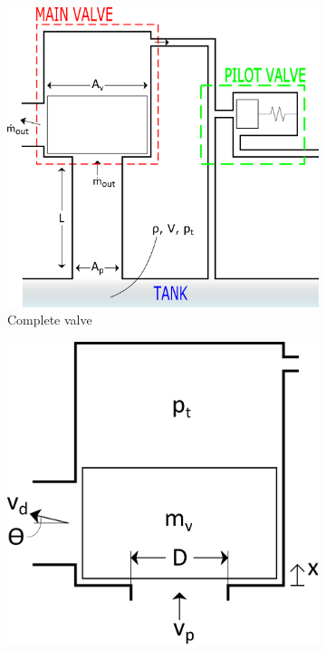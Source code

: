 \begin{figure}[ht]
    \begin{subfigure}{0.6\textwidth}
    \centering
    \includegraphics[width=\textwidth]{Diagrams/Diagram.png}
    \caption{Complete valve}
    \label{fig: DiagramComp}
    \end{subfigure}
    \hfill
    \begin{minipage}{0.3\textwidth}
        \begin{subfigure}{\textwidth}
        \centering
        \includegraphics[width=\textwidth]{Diagrams/Diagram-Main.png}

\end{subfigure}
\end{minipage}
\end{figure}
